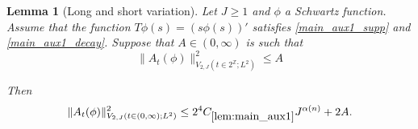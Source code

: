 \documentclass[12pt,reqno]{amsart}
\theoremstyle{plain}
\newtheorem{lemma}[theorem]{Lemma}
\numberwithin{equation}{section}
\theoremstyle{remark}
\newcommand{\using}[1]{}
\begin{document}
\begin{lemma}[Long and short variation]\label{lem:shortlongftc_reduction}\using{lem:shortlongjumps}\using{lem:ftccs-R}\using{lem:ftc_ATphi}\using{lem:main_aux1}
Let $J\ge 1$ and $\phi$ a Schwartz function.
Assume that the function $T\phi(s) = (s \phi(s))'$ satisfies \eqref{main_aux1_supp} and \eqref{main_aux1_decay}.
Suppose that $A\in (0,\infty)$ is such that
\begin{equation}\label{shortlongftc_reduction1} \|A_{t}(\phi)\|^2_{V_{2,J}(t\in 2^\mathbb{Z}; L^2)} \le A
\end{equation}

Then
\begin{equation}\label{shortlongftc_reduction2}
\|A_{t}(\phi)\|_{V_{2,J}(t\in (0,\infty); L^2)}^2 \le 2^4 C_{\ref{lem:main_aux1}} J^{\alpha(n)} + 2A.
\end{equation}
\end{lemma}
\end{document}
